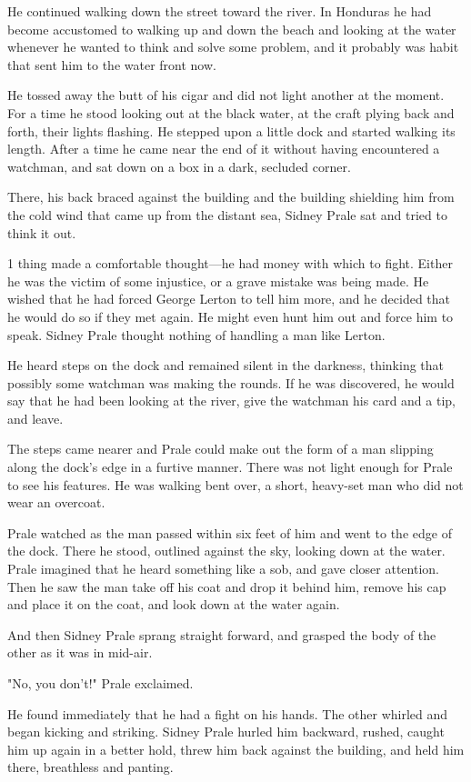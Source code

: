 \documentclass{novel}
\begin{document}
He continued walking down the street toward the river. In Honduras he had become accustomed to walking up and down the beach and looking at the water whenever he wanted to think and solve some problem, and it probably was habit that sent him to the water front now.

He tossed away the butt of his cigar and did not light another at the moment. For a time he stood looking out at the black water, at the craft plying back and forth, their lights flashing. He stepped upon a little dock and started walking its length. After a time he came near the end of it without having encountered a watchman, and sat down on a box in a dark, secluded corner.

There, his back braced against the building and the building shielding him from the cold wind that came up from the distant sea, Sidney Prale sat and tried to think it out.

1 thing made a comfortable thought---he had money with which to fight. Either he was the victim of some injustice, or a grave mistake was being made. He wished that he had forced George Lerton to tell him more, and he decided that he would do so if they met again. He might even hunt him out and force him to speak. Sidney Prale thought nothing of handling a man like Lerton.

He heard steps on the dock and remained silent in the darkness, thinking that possibly some watchman was making the rounds. If he was discovered, he would say that he had been looking at the river, give the watchman his card and a tip, and leave.

The steps came nearer and Prale could make out the form of a man slipping along the dock's edge in a furtive manner. There was not light enough for Prale to see his features. He was walking bent over, a short, heavy-set man who did not wear an overcoat.

Prale watched as the man passed within six feet of him and went to the edge of the dock. There he stood, outlined against the sky, looking down at the water. Prale imagined that he heard something like a sob, and gave closer attention. Then he saw the man take off his coat and drop it behind him, remove his cap and place it on the coat, and look down at the water again.

And then Sidney Prale sprang straight forward, and grasped the body of the other as it was in mid-air.

"No, you don't!" Prale exclaimed.

He found immediately that he had a fight on his hands. The other whirled and began kicking and striking. Sidney Prale hurled him backward, rushed, caught him up again in a better hold, threw him back against the building, and held him there, breathless and panting.
\end{document}
